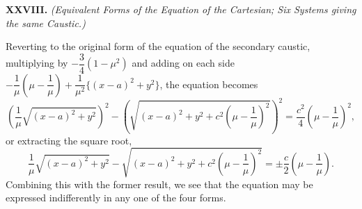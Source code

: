 \documentclass[11pt,a4paper]{book}
\begin{document}
\begin{center}
\medskip\noindent\textbf{XXVIII.}
\textit{(Equivalent Forms of the Equation of the Cartesian; Six Systems giving
the same Caustic.)}

Reverting to the original form of the equation of the secondary
caustic, multiplying by $-\dfrac{3}{4}(1 - \mu^{2})$ and adding on each side
$-\dfrac{1}{\mu} \left( \mu - \dfrac{1}{\mu} \right) + \dfrac{1}{\mu^{2}} \{ (x - a)^{2} + y^{2} \}$,
the equation becomes
\[
\left( \frac{1}{\mu} \sqrt{(x - a)^{2} + y^{2}} \right)^{2}
- \left( \sqrt{(x - a)^{2} + y^{2} + c^{2} \left( \mu - \frac{1}{\mu} \right)^{2}} \right)^{2}
= \frac{c^{2}}{4} \left( \mu - \frac{1}{\mu} \right)^{2},
\]
or extracting the square root,
\[
\frac{1}{\mu} \sqrt{(x - a)^{2} + y^{2}}
- \sqrt{(x - a)^{2} + y^{2} + c^{2} \left( \mu - \frac{1}{\mu} \right)^{2}}
= \pm \frac{c}{2} \left( \mu - \frac{1}{\mu} \right).
\]
Combining this with the former result, we see that the equation
may be expressed indifferently in any one of the four forms.


\end{center}
\end{document}

